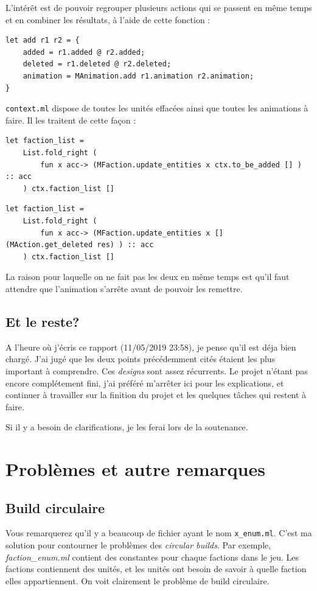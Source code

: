 \documentclass{article}
\begin{document}
L'intérêt est de pouvoir regrouper plusieurs actions qui se passent en même temps et
en combiner les résultats, à l'aide de cette fonction :

\begin{verbatim}
let add r1 r2 = {
    added = r1.added @ r2.added;
    deleted = r1.deleted @ r2.deleted;
    animation = MAnimation.add r1.animation r2.animation;
} 
\end{verbatim}

\texttt{context.ml} dispose de toutes les unités effacées ainsi que toutes les animations à faire. Il les traitent de cette façon : 

\begin{verbatim}
let faction_list =
    List.fold_right (
        fun x acc-> (MFaction.update_entities x ctx.to_be_added [] ) :: acc
    ) ctx.faction_list []
\end{verbatim}

\begin{verbatim}
let faction_list =
    List.fold_right (
        fun x acc-> (MFaction.update_entities x [] (MAction.get_deleted res) ) :: acc
    ) ctx.faction_list []
\end{verbatim}

La raison pour laquelle on ne fait pas les deux en même temps est qu'il faut attendre que l'animation s'arrête avant de pouvoir les remettre.

\subsection{Et le reste?}

A l'heure où j'écris ce rapport (11/05/2019 23:58), je pense qu'il est déja bien chargé. J'ai jugé que les deux points précédemment cités étaient les
plus important à comprendre. Ces \textit{designs} sont assez récurrents. Le projet n'étant pas encore complétement fini,
j'ai préféré m'arrêter ici pour les explications, et continuer à travailler sur la finition du projet et les quelques tâches qui restent à faire.

Si il y a besoin de clarifications, je les ferai lors de la soutenance.

\section{Problèmes et autre remarques}
\subsection{Build circulaire}
Vous remarquerez qu'il y a beaucoup de fichier ayant le nom \texttt{x\_enum.ml}. C'est ma solution pour contourner le problèmes des
\textit{circular builds}. Par exemple, \textit{faction\_enum.ml} contient des constantes pour chaque factions dans le jeu.
Les factions contiennent des unités, et les unités ont besoin de savoir à quelle faction elles appartiennent. On voit clairement
le problème de build circulaire. 
\end{document}
